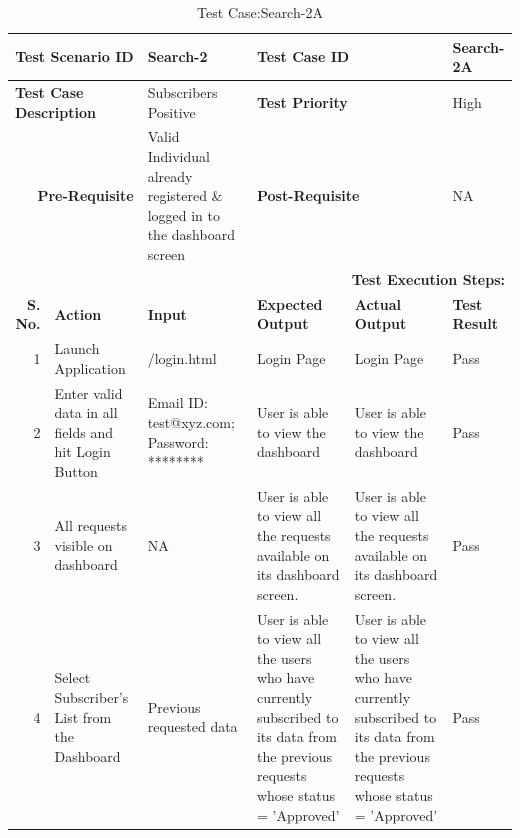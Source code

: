 \documentclass[a4paper, hidelinks, 12pt]{report}
\begin{document}
\begin{itemize}
\begin{table}[H]
  \centering
  \caption{Test Case:Search-2A}
    \begin{tabular}{|r|p{4.355em}|p{7.715em}|p{6.43em}|p{5.855em}|p{5.07em}|}
    \toprule
    \multicolumn{2}{|p{13.425em}|}{\textbf{Test Scenario ID}} & Search-2 & \multicolumn{2}{p{12.285em}|}{\textbf{Test Case ID}} & Search-2A \\
    \midrule
    \multicolumn{2}{|l|}{\multirow{2}[2]{*}{\textbf{Test Case Description}}} & \multirow{2}[2]{*}{Subscribers Positive} & \multicolumn{2}{l|}{\multirow{2}[2]{*}{\textbf{Test Priority}}} & \multirow{2}[2]{*}{High} \\
    \multicolumn{2}{|l|}{} & \multicolumn{1}{l|}{} & \multicolumn{2}{l|}{} & \multicolumn{1}{l|}{} \\
    \midrule
    \multicolumn{2}{|p{13.425em}|}{\textbf{Pre-Requisite}} & Valid Individual already registered \& logged in to the dashboard screen & \multicolumn{2}{p{12.285em}|}{\textbf{Post-Requisite}} & NA \\
    \midrule
    \multicolumn{6}{p{38.495em}|}{\textbf{Test Execution Steps:}} \\
    \midrule
    \multicolumn{1}{|p{5.07em}|}{\textbf{S. No.}} & \textbf{Action } & \textbf{Input} & \textbf{Expected Output} & \textbf{Actual Output} & \textbf{Test Result} \\
    \midrule
    1     & Launch Application & /login.html & Login Page & Login Page & Pass \\
    \midrule
    2     & Enter valid data in all fields and hit Login Button & Email ID: test@xyz.com; Password: ******** & User is able to view the dashboard & User is able to view the dashboard & Pass \\
    \midrule
    3     & All requests visible on dashboard & NA    & User is able to view all the requests available on its dashboard screen. & User is able to view all the requests available on its dashboard screen. & Pass \\
    \midrule
    4     & Select Subscriber's List from the Dashboard & Previous requested data & User is able to view all the users who have currently subscribed to its data from the previous requests whose status = 'Approved' & User is able to view all the users who have currently subscribed to its data from the previous requests whose status = 'Approved' & Pass \\
    \bottomrule
    \end{tabular}%
  \label{tab:Test Case:Search-2A}%
\end{table}%


\end{itemize}
\end{document}
